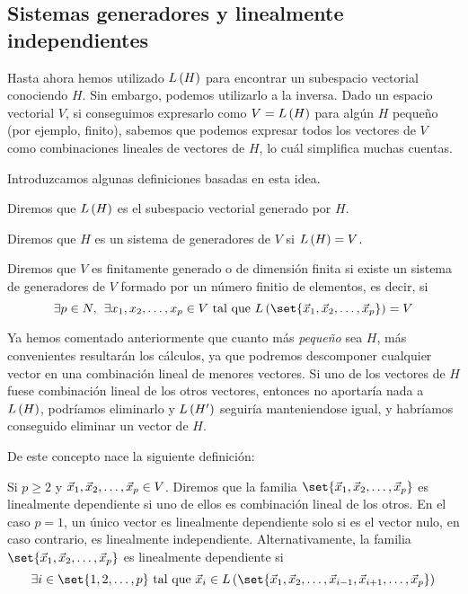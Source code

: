 \documentclass[../algebra_lineal.tex]{subfiles}
\begin{document}
\subsection{Sistemas generadores y linealmente independientes}

Hasta ahora hemos utilizado $L\left(H\right)$ para encontrar un subespacio vectorial conociendo $H$. Sin embargo, podemos utilizarlo a la inversa. Dado un espacio vectorial $V$, si conseguimos expresarlo como $V=L\left(H\right)$ para algún $H$ pequeño (por ejemplo, finito), sabemos que podemos expresar todos los vectores de $V$ como combinaciones lineales de vectores de $H$, lo cuál simplifica muchas cuentas.

Introduzcamos algunas definiciones basadas en esta idea.

\begin{definition}
    Diremos que $L\left(H\right)$ es el subespacio vectorial generado por $H$.
\end{definition}

\begin{definition}
    Diremos que $H$ es un sistema de generadores de $V$ si $L\left(H\right) = V$.
\end{definition}

\begin{definition}
    Diremos que $V$ es finitamente generado o de dimensión finita si existe un sistema de generadores de $V$ formado por un número finitio de elementos, es decir, si
    \[
        \exists p \in N, \spc \exists \dlst{x}{p} \in V \st \lspan{\set{\vlst{x}{p}}} = V
    \]  
\end{definition}

Ya hemos comentado anteriormente que cuanto más \textit{pequeño} sea $H$, más convenientes resultarán los cálculos, ya que podremos descomponer cualquier vector en una combinación lineal de menores vectores. Si uno de los vectores de $H$ fuese combinación lineal de los otros vectores, entonces no aportaría nada a $L\left(H\right)$, podríamos eliminarlo y $L\left(H'\right)$ seguiría manteniendose igual, y habríamos conseguido eliminar un vector de $H$. 

De este concepto nace la siguiente definición:

\begin{definition}
    Si $p \ge 2$ y ${\vec{x}}_{1}, {\vec{x}}_{2}, \dots, {\vec{x}}_{p} \in V$. Diremos que la familia $\set{\vlst{x}{p}}$ es linealmente dependiente si uno de ellos es combinación lineal de los otros. En el caso $p=1$, un único vector es linealmente dependiente solo si es el vector nulo, en caso contrario, es linealmente independiente. Alternativamente, la familia $\set{\vlst{x}{p}}$ es linealmente dependiente si
    \[\exists i \in \set{1, 2, \dots, p} \st \vx_i \in \lspan{\set{\vlst{x}{i-1}, \vx_{i+1}, \dots, \vx_p}}
    \]
\end{definition}
\end{document}
